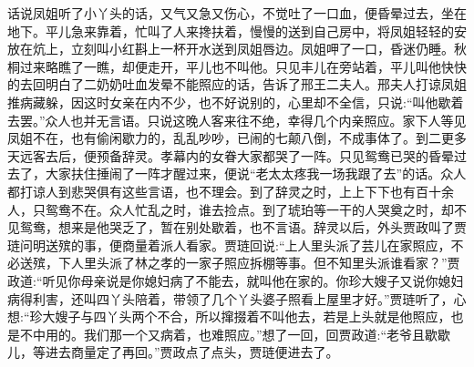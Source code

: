 


\begin{parag}
    话说凤姐听了小丫头的话，又气又急又伤心，不觉吐了一口血，便昏晕过去，坐在地下。平儿急来靠着，忙叫了人来搀扶着，慢慢的送到自己房中，将凤姐轻轻的安放在炕上，立刻叫小红斟上一杯开水送到凤姐唇边。凤姐呷了一口，昏迷仍睡。秋桐过来略瞧了一瞧，却便走开，平儿也不叫他。只见丰儿在旁站着，平儿叫他快快的去回明白了二奶奶吐血发晕不能照应的话，告诉了邢王二夫人。邢夫人打谅凤姐推病藏躲，因这时女亲在内不少，也不好说别的，心里却不全信，只说:“叫他歇着去罢。”众人也并无言语。只说这晚人客来往不绝，幸得几个内亲照应。家下人等见凤姐不在，也有偷闲歇力的，乱乱吵吵，已闹的七颠八倒，不成事体了。到二更多天远客去后，便预备辞灵。孝幕内的女眷大家都哭了一阵。只见鸳鸯已哭的昏晕过去了，大家扶住捶闹了一阵才醒过来，便说“老太太疼我一场我跟了去”的话。众人都打谅人到悲哭俱有这些言语，也不理会。到了辞灵之时，上上下下也有百十余人，只鸳鸯不在。众人忙乱之时，谁去捡点。到了琥珀等一干的人哭奠之时，却不见鸳鸯，想来是他哭乏了，暂在别处歇着，也不言语。辞灵以后，外头贾政叫了贾琏问明送殡的事，便商量着派人看家。贾琏回说:“上人里头派了芸儿在家照应，不必送殡，下人里头派了林之孝的一家子照应拆棚等事。但不知里头派谁看家？”贾政道:“听见你母亲说是你媳妇病了不能去，就叫他在家的。你珍大嫂子又说你媳妇病得利害，还叫四丫头陪着，带领了几个丫头婆子照看上屋里才好。”贾琏听了，心想:“珍大嫂子与四丫头两个不合，所以撺掇着不叫他去，若是上头就是他照应，也是不中用的。我们那一个又病着，也难照应。”想了一回，回贾政道:“老爷且歇歇儿，等进去商量定了再回。”贾政点了点头，贾琏便进去了。
\end{parag}


